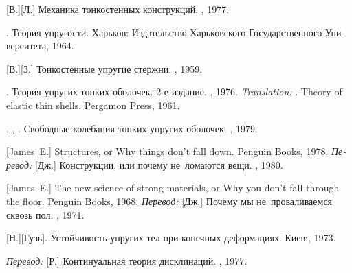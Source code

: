 \begin{thebibliography}{123}
\begin{otherlanguage}{russian}
[В.][Л.]
Механика тонкостенных конструкций.
\maschinenbaumoskauerverlag,
1977.

.
Теория упругости.
Харьков:
Издательство Харьковского Государственного Университета,
1964.

[В.][З.]
Тонкостенные упругие стержни.
\fizmatgiz, 1959.

.
Теория упругих тонких оболочек.
2-е издание. \naukapublisher, 1976.
\emph{Translation:}
.
Theory of elastic thin shells.
Pergamon Press, 1961.

,
,
.
Свободные ко\-леба\-ния тонких упругих оболочек.
\naukapublisher, 1979.

[James~E.]
Structures, or Why things don’t fall down.
Penguin Books,
1978.
\emph{Перевод:}
[Дж.]
Конструкции, или почему не~ломаются вещи.
\mirpublisher,
1980.

[James~E.]
The new science of strong materials, or Why you don’t fall through the floor.
Penguin Books,
1968.
\emph{Перевод:}
[Дж.]
Почему мы не~проваливаемся сквозь пол.
\mirpublisher,
1971.

[Н.][Гузь].
Устойчивость упругих тел при конечных деформациях.
Киев:\;, 1973.


\emph{Перевод:}
[Р.]
Континуальная теория дисклинаций.
\mirpublisher,
1977.


\end{otherlanguage}
\end{thebibliography}
